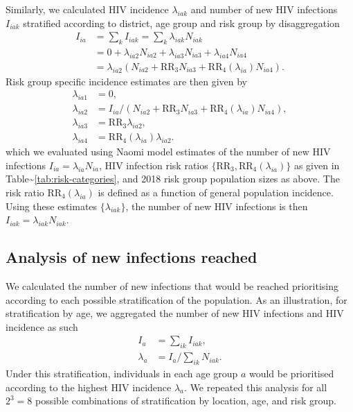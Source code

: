 \documentclass[
]{article}
\begin{document}
Similarly, we calculated HIV incidence \(\lambda_{iak}\) and number of
new HIV infections \(I_{iak}\) stratified according to district, age
group and risk group by disaggregation \begin{align}
    I_{ia} &= \sum_k I_{iak} = \sum_k \lambda_{iak}N_{iak} \\
    &= 0 + \lambda_{ia2} N_{ia2} + \lambda_{ia3} N_{ia3} + \lambda_{ia4} N_{ia4} \\
    &= \lambda_{ia2} \left(N_{ia2}  + \text{RR}_{3} N_{ia3} + \text{RR}_4(\lambda_{ia}) N_{ia4}  \right).
\end{align} Risk group specific incidence estimates are then given by
\begin{align}
    \lambda_{ia1} &= 0, \\
    \lambda_{ia2} &= I_{ia} / \left(N_{ia2} + \text{RR}_{3} N_{ia3} + \text{RR}_4(\lambda_{ia}) N_{ia4}\right), \\
    \lambda_{ia3} &= \text{RR}_{3} \lambda_{ia2}, \\
    \lambda_{ia4} &= \text{RR}_4(\lambda_{ia}) \lambda_{ia2}.
\end{align} which we evaluated using Naomi model estimates of the number
of new HIV infections \(I_{ia} = \lambda_{ia} N_{ia}\), HIV infection
risk ratios \(\{\text{RR}_3, \text{RR}_4(\lambda_{ia})\}\) as given in
Table\textasciitilde{}\ref{tab:risk-categories}, and 2018 risk group
population sizes as above. The risk ratio \(\text{RR}_4(\lambda_{ia})\)
is defined as a function of general population incidence. Using these
estimates \(\{\lambda_{iak}\}\), the number of new HIV infections is
then \(I_{iak} = \lambda_{iak} N_{iak}\).

\hypertarget{analysis-of-new-infections-reached}{%
\subsection{Analysis of new infections
reached}\label{analysis-of-new-infections-reached}}

We calculated the number of new infections that would be reached
prioritising according to each possible stratification of the
population. As an illustration, for stratification by age, we aggregated
the number of new HIV infections and HIV incidence as such \begin{align}
    I_a &= \sum_{ik} I_{iak}, \\
    \lambda_a &= I_a / \sum_{ik} N_{iak}.
\end{align} Under this stratification, individuals in each age group
\(a\) would be prioritised according to the highest HIV incidence
\(\lambda_a\). We repeated this analysis for all \(2^3 = 8\) possible
combinations of stratification by location, age, and risk group.
\end{document}

